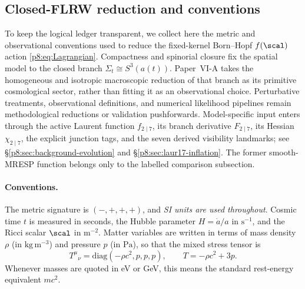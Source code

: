\documentclass[12pt,a4paper]{article}
\begin{document}
\subsection{Closed-FLRW reduction and conventions}
\label{p8:sec:std_cosmo_reductions}

To keep the logical ledger transparent, we collect here the metric and
observational conventions used to reduce the fixed-kernel Born--Hopf
\(f(\scal)\) action \eqref{p8:eq:Lagrangian}.  Compactness and spinorial
closure fix the spatial model to the closed branch
\(\Sigma_t\cong S^3(a(t))\).  Paper~VI-A takes the homogeneous and isotropic
macroscopic reduction of that branch as its primitive cosmological sector,
rather than fitting it as an observational choice.  Perturbative treatments,
observational definitions, and numerical likelihood pipelines remain
methodological reductions or validation pushforwards.  Model-specific input
enters through the active Laurent function \(f_{2\mid7}\), its branch derivative
\(F_{2\mid7}\), its Hessian \(\chi_{2\mid7}\), the explicit junction tags, and the
seven derived visibility landmarks; see
\S\ref{p8:sec:background-evolution} and
\S\ref{p8:sec:laur17-inflation}.  The former smooth-MRESP function belongs
only to the labelled comparison subsection.

\paragraph{Conventions.}
The metric signature is $(-,+,+,+)$, and \emph{SI units are used throughout}.
Cosmic time $t$ is measured in seconds, the Hubble parameter
$H=\dot a/a$ in $\mathrm{s}^{-1}$, and the Ricci scalar $\scal$ in
$\mathrm{m}^{-2}$. Matter variables are written in terms of mass density
$\rho$ (in $\mathrm{kg\,m^{-3}}$) and pressure $p$ (in $\mathrm{Pa}$), so that
the mixed stress tensor is
\[
T^\mu{}_\nu=\mathrm{diag}(-\rho c^2,p,p,p),
\qquad
T=-\rho c^2+3p.
\]
Whenever masses are quoted in eV or GeV, this means the standard
rest-energy equivalent $mc^2$.
\end{document}
